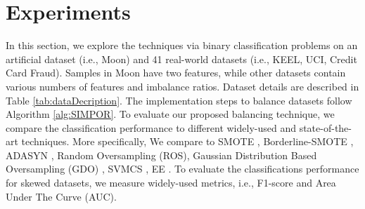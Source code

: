 


\section{Experiments}
\label{sec:experiments}
In this section, we explore the techniques via binary classification problems on an artificial dataset (i.e., Moon) and 41 real-world datasets (i.e., KEEL, UCI, Credit Card Fraud). Samples in Moon have two features, while other datasets contain various numbers of features and imbalance ratios. Dataset details are described in Table \ref{tab:dataDecription}.  
The implementation steps to balance datasets follow Algorithm \ref{alg:SIMPOR}. To evaluate our proposed balancing technique, we compare the classification performance to different widely-used and state-of-the-art techniques. More specifically, We compare \Methodname{} to SMOTE \cite{chawla_smote:_2002}, Borderline-SMOTE \cite{bordersmote},  ADASYN \cite{ADASYN}, Random Oversampling (ROS), Gaussian Distribution Based Oversampling (GDO) \cite{bib:GDO}, SVMCS \cite{cssvm}, EE \cite{EE}. To evaluate the classifications performance for skewed datasets, we measure widely-used metrics, i.e., F1-score and Area Under The Curve (AUC).

